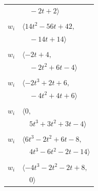 \documentclass[11pt]{article}
\begin{document}
\begin{longtable}{@{}ll@{}}
 & $\quad -2t+2\rangle$\\
\addlinespace[2pt]
\multicolumn{2}{@{}p{0.97\textwidth}@{}}{$i=5$, $D_i=1$, $\rho_{ij}$: $8{:}1, \allowbreak 16{:}1, \allowbreak 17{:}2, \allowbreak 18{:}1, \allowbreak 28{:}2, \allowbreak 29{:}1, \allowbreak 31{:}1, \allowbreak 35{:}1, \allowbreak 36{:}1, \allowbreak 38{:}2, \allowbreak 43{:}2$}\\
$w_i$ & $\langle 14t^{2}-56t+42,$\\
 & $\quad -14t+14\rangle$\\
\addlinespace[2pt]
\multicolumn{2}{@{}p{0.97\textwidth}@{}}{$i=6$, $D_i=1$, $\rho_{ij}$: $9{:}1, \allowbreak 15{:}2, \allowbreak 17{:}2, \allowbreak 18{:}1, \allowbreak 25{:}2, \allowbreak 40{:}1$}\\
$w_i$ & $\langle -2t+4,$\\
 & $\quad -2t^{2}+6t-4\rangle$\\
\addlinespace[2pt]
\multicolumn{2}{@{}p{0.97\textwidth}@{}}{$i=7$, $D_i=1$, $\rho_{ij}$: $0{:}1, \allowbreak 16{:}2, \allowbreak 32{:}2, \allowbreak 37{:}1, \allowbreak 41{:}1, \allowbreak 42{:}2$}\\
$w_i$ & $\langle -2t^{3}+2t+6,$\\
 & $\quad -4t^{2}+4t+6\rangle$\\
\addlinespace[2pt]
\multicolumn{2}{@{}p{0.97\textwidth}@{}}{$i=8$, $D_i=1$, $\rho_{ij}$: $1{:}2, \allowbreak 2{:}2, \allowbreak 3{:}1, \allowbreak 4{:}2, \allowbreak 5{:}2, \allowbreak 10{:}1, \allowbreak 12{:}1, \allowbreak 37{:}2$}\\
$w_i$ & $\langle 0,$\\
 & $\quad 5t^{3}+3t^{2}+3t-4\rangle$\\
\addlinespace[2pt]
\multicolumn{2}{@{}p{0.97\textwidth}@{}}{$i=9$, $D_i=1$, $\rho_{ij}$: $2{:}2, \allowbreak 6{:}2, \allowbreak 12{:}1, \allowbreak 13{:}1, \allowbreak 18{:}1, \allowbreak 24{:}2, \allowbreak 29{:}2, \allowbreak 42{:}2$}\\
$w_i$ & $\langle 6t^{3}-2t^{2}+6t-8,$\\
 & $\quad 4t^{3}-6t^{2}-2t-14\rangle$\\
\addlinespace[2pt]
\multicolumn{2}{@{}p{0.97\textwidth}@{}}{$i=10$, $D_i=1$, $\rho_{ij}$: $3{:}1, \allowbreak 8{:}2, \allowbreak 12{:}1, \allowbreak 13{:}2, \allowbreak 21{:}2, \allowbreak 27{:}2, \allowbreak 30{:}2, \allowbreak 35{:}2, \allowbreak 38{:}2, \allowbreak 43{:}2$}\\
$w_i$ & $\langle -4t^{3}-2t^{2}-2t+8,$\\
 & $\quad 0\rangle$\\

\end{longtable}
\end{document}
